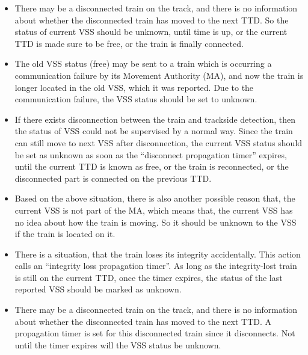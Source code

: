 \documentclass[article,dr=phil,type=msc,colorback,accentcolor=tud9c]{tudthesis}
\begin{document}
  \begin{itemize}
	
	\item
	
	There may be a disconnected train on the track, and there is no information about whether the disconnected train has moved to the next TTD. So the status of current VSS should be unknown, until time is up, or the current TTD is made sure to be free, or the train is finally connected.
	
	\item 
	
	The old VSS status (free) may be sent to a train which is occurring a communication failure by its Movement Authority (MA), and now the train is longer located in the old VSS, which it was reported. Due to the communication failure, the VSS status should be set to unknown.
	
	\item 
	
	If there exists disconnection between the train and trackside detection, then the status of VSS could not be supervised by a normal way. Since the train can still move to next VSS after disconnection, the current VSS status should be set as unknown as soon as the ``disconnect propagation timer'' expires, until the current TTD is known as free, or the train is reconnected, or the disconnected part is connected on the previous TTD.
	
	\item 
	
	Based on the above situation, there is also another possible reason that, the current VSS is not part of the MA, which means that, the current VSS has no idea about how the train is moving. So it should be unknown to the VSS if the train is located on it.
	
	\item 
	
	There is a situation, that the train loses its integrity accidentally. This action calls an ``integrity loss propagation timer''. As long as the integrity-lost train is still on the current TTD, once the timer expires, the status of the last reported VSS should be marked as unknown.
	
	\item 
	
	There may be a disconnected train on the track, and there is no information about whether the disconnected train has moved to the next TTD. A propagation timer is set for this disconnected train since it disconnects. Not until the timer expires will the VSS status be unknown.
	
  \end{itemize}	
\end{document}
